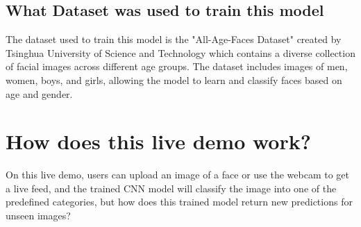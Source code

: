 \documentclass[11 pt , a 4 paper ]{article}
\theoremstyle{definition}
\begin{document}
\subsection{What Dataset was used to train this model}
The dataset used to train this model is the "All-Age-Faces Dataset" created by Tsinghua University of Science and Technology which contains a diverse collection of facial images across different age groups. The dataset includes images of men, women, boys, and girls, allowing the model to learn and classify faces based on age and gender.

\section{How does this live demo work?}
On this live demo, users can upload an image of a face or use the webcam to get a live feed, and the trained CNN model will classify the image into one of the predefined categories, but how does this trained model return new predictions for unseen images?

\newpage
\end{document}
